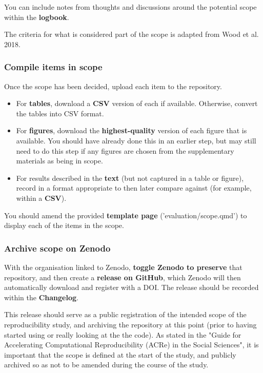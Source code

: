You can include notes from thoughts and discussions around the potential scope within the \textbf{logbook}.

The criteria for what is considered part of the scope is adapted from Wood et al. 2018.\autocite{wood_replication_2018, wood_push_2018}

\vspace{0.5cm}
\subsubsection{Compile items in scope}

Once the scope has been decided, upload each item to the repository.

\begin{itemize}
    \item For \textbf{tables}, download a \textbf{CSV} version of each if available. Otherwise, convert the tables into CSV format.
    \item For \textbf{figures}, download the \textbf{highest-quality} version of each figure that is available. You should have already done this in an earlier step, but may still need to do this step if any figures are chosen from the supplementary materials as being in scope.
    \item For results described in the \textbf{text} (but not captured in a table or figure), record in a format appropriate to then later compare against (for example, within a \textbf{CSV}).
\end{itemize}

You should amend the provided \textbf{template page} ('evaluation/scope.qmd') to display each of the items in the scope.

\vspace{0.5cm}
\subsubsection{Archive scope on Zenodo}

With the organisation linked to Zenodo, \textbf{toggle Zenodo to preserve} that repository, and then create a \textbf{release on GitHub}, which Zenodo will then automatically download and register with a DOI. The release should be recorded within the \textbf{Changelog}.

This release should serve as a public registration of the intended scope of the reproducibility study, and archiving the repository at this point (prior to having started using or really looking at the the code). As stated in the "Guide for Accelerating Computational Reproducibility (ACRe) in the Social Sciences", it is important that the scope is defined at the start of the study, and publicly archived so as not to be amended during the course of the study.\cite{berkeley_initiative_for_transparency_in_the_social_sciences_guide_2022}

